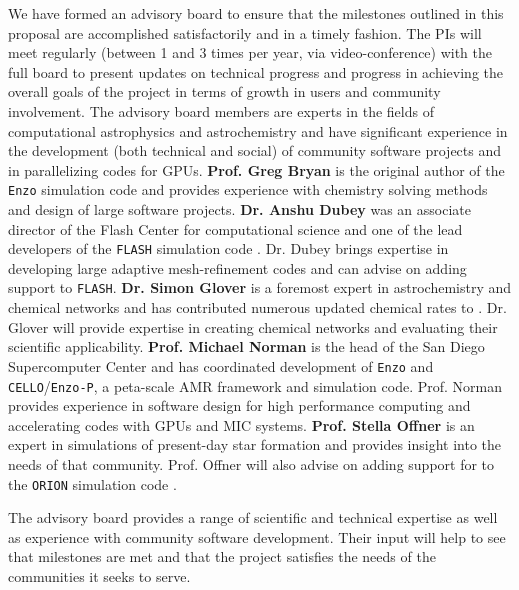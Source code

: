 We have formed an advisory board to ensure that the milestones
outlined in this proposal are accomplished satisfactorily and in a timely
fashion.  The PIs will meet regularly (between 1 and 3 times
per year, via video-conference) with the full board to present updates
on technical progress and progress in achieving the overall goals of
the project in terms of growth in users and community involvement.  The
advisory board members are experts in the fields of computational
astrophysics and astrochemistry and have significant experience in the
development (both technical and social) of community software projects
and in parallelizing codes for GPUs.
{\bf Prof. Greg Bryan} is the original author of the \texttt{Enzo}
simulation code and provides experience with chemistry solving methods
and design of large software projects.
{\bf Dr. Anshu Dubey} was an associate director of the Flash Center
for computational science and one of the lead developers of the
\texttt{FLASH} simulation code \citep{2000ApJS..131..273F,
  2009arXiv0903.4875D}.  Dr. Dubey brings expertise in developing
large adaptive mesh-refinement codes and can advise on adding
\grackle{} support to \texttt{FLASH}.
{\bf Dr. Simon Glover} is a foremost expert in astrochemistry and
chemical networks and has contributed numerous updated chemical rates to
\grackle{}.  Dr. Glover will provide expertise in creating chemical
networks and evaluating their scientific applicability.
{\bf Prof. Michael Norman} is the head of the San Diego Supercomputer
Center and has coordinated development of \texttt{Enzo} and
\texttt{CELLO}/\texttt{Enzo-P}, a peta-scale AMR framework and
simulation code.  Prof. Norman provides experience in software design for
high performance computing and accelerating codes with GPUs and MIC
systems.
{\bf Prof. Stella Offner} is an expert in simulations of present-day
star formation and provides insight into the needs of that community.
Prof. Offner will also advise on adding support for \grackle{} to the
\texttt{ORION} simulation code \citep{2012ApJ...745..139L}.

The advisory board provides a range of scientific and technical
expertise as well as experience with community software development.
Their input will help to see that milestones are met and that
the project satisfies the needs of the communities it seeks to serve.
